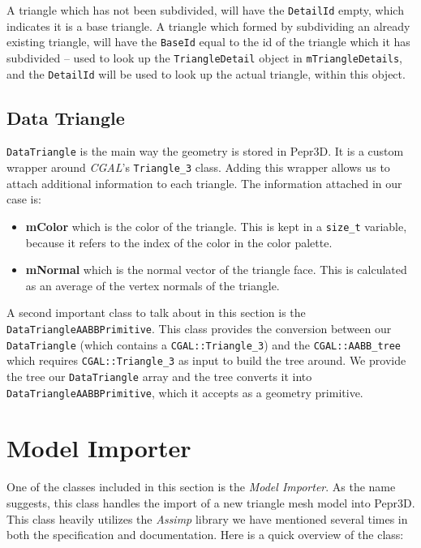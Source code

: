 A triangle which has not been subdivided, will have the \texttt{DetailId} empty, which indicates it is a base triangle. A triangle which formed by subdividing an already existing triangle, will have the \texttt{BaseId} equal to the id of the triangle which it has subdivided -- used to look up the \texttt{TriangleDetail} object in \texttt{mTriangleDetails}, and the \texttt{DetailId} will be used to look up the actual triangle, within this object.

\subsection{Data Triangle}

\texttt{DataTriangle} is the main way the geometry is stored in Pepr3D. It is a custom wrapper around \textit{CGAL}'s \texttt{Triangle\_3} class. Adding this wrapper allows us to attach additional information to each triangle. The information attached in our case is:

\begin{itemize}
\item \textbf{mColor} which is the color of the triangle. This is kept in a \texttt{size\_t} variable, because it refers to the index of the color in the color palette.

\item \textbf{mNormal} which is the normal vector of the triangle face. This is calculated as an average of the vertex normals of the triangle.

\end{itemize}

A second important class to talk about in this section is the \texttt{Data\-Triangle\-AABB\-Primitive}. This class provides the conversion between our \texttt{Data\-Triangle} (which contains a \texttt{CGAL::Triangle\_3}) and the \texttt{CGAL::AABB\_tree} which requires \texttt{CGAL::Triangle\_3} as input to build the tree around. We provide the tree our \texttt{Data\-Triangle} array and the tree converts it into \texttt{Data\-Triangle\-AABB\-Primitive}, which it accepts as a geometry primitive.

\section{Model Importer}

One of the classes included in this section is the \textit{Model Importer}. As the name suggests, this class handles the import of a new triangle mesh model into Pepr3D. This class heavily utilizes the \textit{Assimp} library we have mentioned several times in both the specification and documentation. Here is a quick overview of the class:

